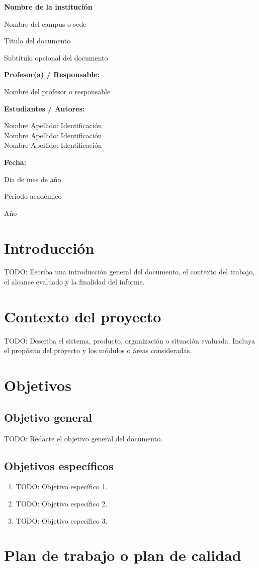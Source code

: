 \documentclass[11pt,spanish]{article}
\title{\DocumentoTitulo}
\author{\AutoresPortada}
\date{\FechaDocumento}
\newcommand{\Institucion}{Nombre de la institución}
\newcommand{\Campus}{Nombre del campus o sede}
\newcommand{\DocumentoTitulo}{Título del documento}
\newcommand{\DocumentoSubtitulo}{Subtítulo opcional del documento}
\newcommand{\Profesor}{Nombre del profesor o responsable}
\newcommand{\FechaDocumento}{Día de mes de año}
\newcommand{\PeriodoAcademico}{Periodo académico}
\newcommand{\AnioDocumento}{Año}
\newcommand{\AutoresPortada}{%
    Nombre Apellido: Identificación\\
    Nombre Apellido: Identificación\\
    Nombre Apellido: Identificación%
}
\newcommand{\MakeCover}{%
\begin{titlepage}
\thispagestyle{empty}
\centering

{\bfseries \huge \Institucion \par}
\vspace{0.25cm}
{\LARGE \Campus \par}

\vfill

{\huge \DocumentoTitulo \par}
\vspace{0.4cm}
{\Large \DocumentoSubtitulo \par}

\vfill

{\bfseries \LARGE Profesor(a) / Responsable: \par}
{\Large \Profesor \par}

\vfill

{\bfseries \LARGE Estudiantes / Autores: \par}
{\Large \AutoresPortada \par}

\vfill

{\bfseries\LARGE Fecha: \par}
{\Large \FechaDocumento \par}

\vfill

{\LARGE \PeriodoAcademico \par}
{\LARGE \AnioDocumento \par}

\end{titlepage}%
}
\begin{document}
\hypersetup{pageanchor=false}

\MakeCover

\pagestyle{empty}
\tableofcontents
\clearpage
{}
\hypersetup{pageanchor=true}
\pagestyle{fancy}

\section{Introducción}

TODO: Escriba una introducción general del documento, el contexto del trabajo, el alcance evaluado y la finalidad del informe.

\section{Contexto del proyecto}

TODO: Describa el sistema, producto, organización o situación evaluada. Incluya el propósito del proyecto y los módulos o áreas consideradas.

\section{Objetivos}

\subsection{Objetivo general}

TODO: Redacte el objetivo general del documento.

\subsection{Objetivos específicos}

\begin{enumerate}[label=\arabic*.]
    \item TODO: Objetivo específico 1.
    \item TODO: Objetivo específico 2.
    \item TODO: Objetivo específico 3.
\end{enumerate}

\section{Plan de trabajo o plan de calidad}
\end{document}
